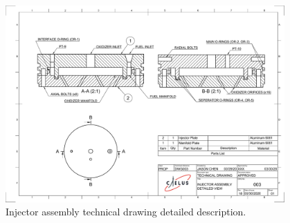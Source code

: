 \documentclass[9pt]{article} %
\numberwithin{equation}{section} %
\begin{document}
\begin{figure}
\centering
\includegraphics[scale=0.5, width=0.95\textwidth, clip]{Injector Assembly DWG003.pdf} %
\caption{Injector assembly technical drawing detailed description.}
\label{fig:injector_detailed}
\end{figure}
\end{document}
